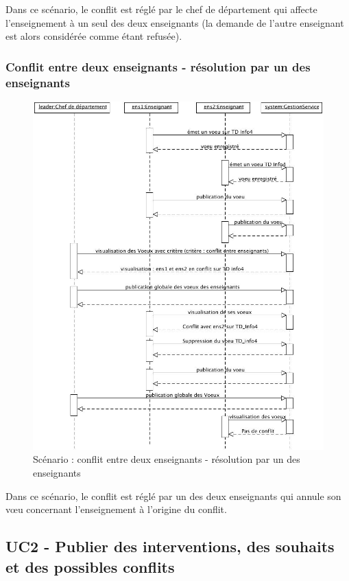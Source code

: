  Dans ce scénario, le conflit est réglé par le chef de département qui affecte l'enseignement à un seul des deux enseignants (la demande de l'autre enseignant est alors considérée comme étant refusée).

 \subsubsection{Conflit entre deux enseignants - résolution par un des enseignants}
 \begin{figure}[!htbp]
 \begin{center}
 \includegraphics[width=15cm]{fig/scenario2.jpg}
 \caption{Scénario : conflit entre deux enseignants - résolution par un des enseignants}
 \end{center}
 \end{figure}

 Dans ce scénario, le conflit est réglé par un des deux enseignants qui annule son v\oe u concernant l'enseignement à l'origine du conflit.  


\subsection{UC2 - Publier des interventions, des souhaits et des possibles conflits}

